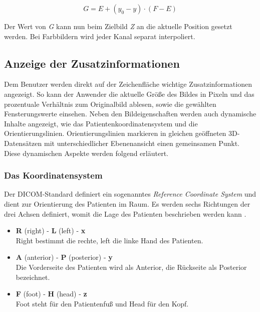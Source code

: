 \begin{equation}
G = E + (y_0 - y) \cdot (F-E)
\end{equation}

Der Wert von \textit{G} kann nun beim Zielbild \textit{Z} an die aktuelle Position gesetzt werden. Bei Farbbildern wird jeder Kanal separat interpoliert.

\subsection{Anzeige der Zusatzinformationen}

Dem Benutzer werden direkt auf der Zeichenfläche wichtige Zusatzinformationen angezeigt. So kann der Anwender die aktuelle Größe des Bildes in Pixeln und das prozentuale Verhältnis zum Originalbild ablesen, sowie die gewählten Fensterungswerte einsehen. Neben den Bildeigenschaften werden auch dynamische Inhalte angezeigt, wie das Patientenkoordinatensystem und die Orientierungslinien. Orientierungslinien markieren in gleichen geöffneten 3D-Datensätzen mit unterschiedlicher Ebenenansicht einen gemeinsamen Punkt. Diese dynamischen Aspekte werden folgend erläutert.

\subsubsection{Das Koordinatensystem}

Der DICOM-Standard definiert ein sogenanntes \textit{Reference Coordinate System} \cite[S. 55]{dicom:iod} und dient zur Orientierung des Patienten im Raum. Es werden sechs Richtungen der drei Achsen definiert, womit die Lage des Patienten beschrieben werden kann \cite[C.7.6.1.1.1]{dicom:iod}. 

\begin{itemize}
\item \textbf{R} (right) - \textbf{L} (left) - \textbf{x} \\
	Right bestimmt die rechte, left die linke Hand des Patienten.
\item \textbf{A} (anterior) - \textbf{P} (posterior) - \textbf{y} \\
   Die Vorderseite des Patienten wird als Anterior, die Rückseite als Posterior bezeichnet.
\item \textbf{F} (foot) - \textbf{H} (head) - \textbf{z} \\
 Foot steht für den Patientenfuß und Head für den Kopf.
\end{itemize}

